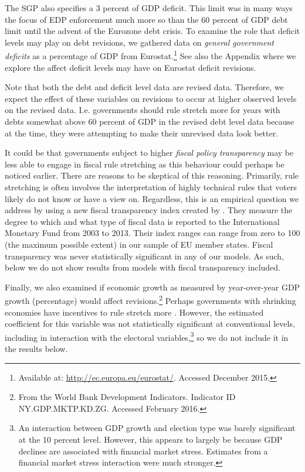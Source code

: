 \documentclass[]{article}
\begin{document}
The SGP also specifies a 3 percent of GDP deficit. This limit was in many ways the focus of EDP enforcement much more so than the 60 percent of GDP debt limit until the advent of the Eurozone debt crisis. To examine the role that deficit levels may play on debt revisions, we gathered data on \emph{general government deficits} as a percentage of GDP from Eurostat.\footnote{Available at: \url{http://ec.europa.eu/eurostat/}. Accessed December 2015.} See also the Appendix where we explore the affect deficit levels may have on Eurostat deficit revisions.

Note that both the debt and deficit level data are revised data. Therefore, we expect the effect of these variables on revisions to occur at higher observed levels on the revised data. I.e. governments should rule stretch more for years with debts somewhat above 60 percent of GDP in the revised debt level data because at the time, they were attempting to make their unrevised data look better.

It could be that governments subject to higher \emph{fiscal policy transparency} may be less able to engage in fiscal rule stretching as this behaviour could perhaps be noticed earlier. There are reasons to be skeptical of this reasoning. Primarily, rule stretching is often involves the interpretation of highly technical rules that voters likely do not know or have a view on. Regardless, this is an empirical question we address by using a new fiscal transparency index created by \cite{Wang2015}. They measure the degree to which and what type of fiscal data is reported to the International Monetary Fund from 2003 to 2013. Their index ranges can range from zero to 100 (the maximum possible extent) in our sample of EU member states. Fiscal transparency was never statistically significant in any of our models. As such, below we do not show results from models with fiscal transparency included.

Finally, we also examined if economic growth as measured by year-over-year GDP growth (percentage) would affect revisions.\footnote{From the World Bank Development Indicators. Indicator ID NY.GDP.MKTP.KD.ZG. Accessed February 2016.} Perhaps governments with shrinking economies have incentives to rule stretch more \citep{DeCastro2013}. However, the estimated coefficient for this variable was not statistically significant at conventional levels, including in interaction with the electoral variables,\footnote{An interaction between GDP growth and election type was barely significant at the 10 percent level. However, this appears to largely be because GDP declines are associated with financial market stress. Estimates from a financial market stress interaction were much stronger.} so we do not include it in the results below.
\end{document}

